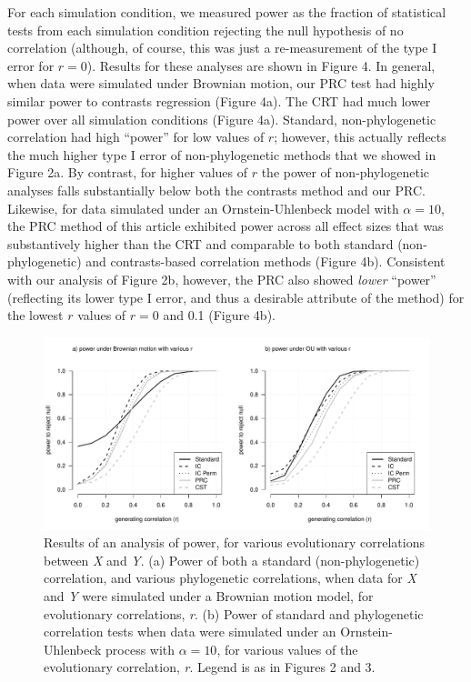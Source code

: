 \documentclass[fleqn,10pt,lineno]{wlpeerj} %
\begin{document}
For each simulation condition, we measured power as the fraction of statistical tests from each simulation condition rejecting the null hypothesis of no correlation (although, of course, this was just a re-measurement of the type I error for \(r = 0\)). Results for these analyses are shown in Figure 4. In general, when data were simulated under Brownian motion, our PRC test had highly similar power to contrasts regression (Figure 4a). The CRT had much lower power over all simulation conditions (Figure 4a). Standard, non-phylogenetic correlation had high ``power'' for low values of \(r\); however, this actually reflects the much higher type I error of non-phylogenetic methods that we showed in Figure 2a. By contrast, for higher values of \(r\) the power of non-phylogenetic analyses falls substantially below both the contrasts method and our PRC. Likewise, for data simulated under an Ornstein-Uhlenbeck model with \(\alpha = 10\), the PRC method of this article exhibited power across all effect sizes that was substantively higher than the CRT and comparable to both standard (non-phylogenetic) and contrasts-based correlation methods (Figure 4b). Consistent with our analysis of Figure 2b, however, the PRC also showed \emph{lower} ``power'' (reflecting its lower type I error, and thus a desirable attribute of the method) for the lowest \(r\) values of \(r = 0\) and 0.1 (Figure 4b).

\begin{figure}
\includegraphics[width=1\linewidth]{Harmon-and-Revell_NonParametricPCM.PeerJ_files/figure-latex/Harmon-fig4-1} \caption{Results of an analysis of power, for various evolutionary correlations between \emph{X} and \emph{Y}. (a) Power of both a standard (non-phylogenetic) correlation, and various phylogenetic correlations, when data for \emph{X} and \emph{Y} were simulated under a Brownian motion model, for evolutionary correlations, \emph{r}. (b) Power of standard and phylogenetic correlation tests when data were simulated under an Ornstein-Uhlenbeck process with $\alpha = 10$, for various values of the evolutionary correlation, \emph{r}. Legend is as in Figures 2 and 3.}\label{fig:Harmon-fig4}
\end{figure}
\end{document}
